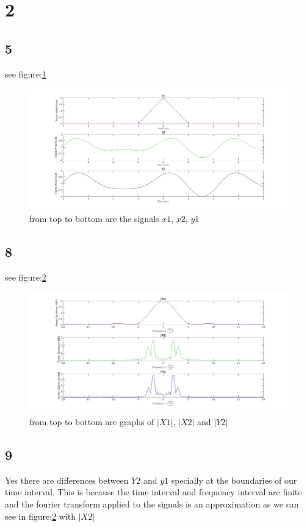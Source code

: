 \section{2}
\subsection{5}
see figure:\ref{fig:1}
\begin{figure}[h]
    \centering
    \includegraphics[width=\textwidth]{assets/hw1_2_5.jpg}
    \caption{from top to bottom are the signals $x1$, $x2$, $y1$}
    \label{fig:1}
\end{figure}
\subsection{8}
see figure:\ref{fig:2}
\begin{figure}[h]
    \centering
    \includegraphics[width=\textwidth]{assets/hw1_2_8.jpg}
    \caption{from top to bottom are graphs of $|X1|$, $|X2|$ and $|Y2|$}
    \label{fig:2}
\end{figure}
\subsection{9}
Yes there are differences between $Y2$ and $y1$ specially at the boundaries of our time interval. This is because the time interval and frequency interval are finite and the fourier transform applied to the signals is an approximation as we can see in figure:\ref{fig:2} with $|X2|$

